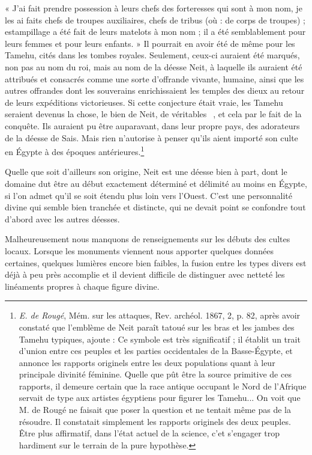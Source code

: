 \documentclass[a4paper, 11pt, oneside]{article}
\newcommand*\hieroglyhicsAADS{}
\newcommand*\hieroglyhicsAAEF{}
\newcommand*\hieroglyhicsAAEK{}
\begin{document}
« J'ai fait prendre possession à leurs chefs des forteresses qui sont à mon nom, je les ai faits chefs de troupes auxiliaires, chefs de tribus (où : de corps de troupes) ; estampillage a été fait de leurs matelots à mon nom ; il a été semblablement pour leurs femmes et pour leurs enfants. »
Il pourrait en avoir été de même pour les Tamehu, cités dans les tombes royales. Seulement, ceux-ci auraient été marqués, non pas au nom du roi, mais au nom de la déesse Neit, à laquelle ils auraient été attribués et consacrés comme une sorte d'offrande vivante, humaine, ainsi que les autres offrandes dont les souverains enrichissaient les temples des dieux au retour de leurs expéditions victorieuses. Si cette conjecture était vraie, les Tamehu seraient devenus la chose, le bien de Neit, de véritables $\hieroglyhicsAAEK\:\hieroglyhicsAADS\:\hieroglyhicsAAEF$, et cela par le fait de la conquête. Ils auraient pu être auparavant, dans leur propre pays, des adorateurs de la déesse de Sais. Mais rien n'autorise à penser qu'ils aient importé son culte en Égypte à des époques antérieures.\footnote{\emph{E. de Rougé}, Mém. sur les attaques, Rev. archéol. 1867, 2, p. 82, après avoir constaté que l'emblème de Neit paraît tatoué sur les bras et les jambes des Tamehu typiques, ajoute : Ce symbole est très significatif ; il établit un trait d'union entre ces peuples et les parties occidentales de la Basse-Égypte, et annonce les rapports originels entre les deux populations quant à leur principale divinité féminine. Quelle que pût être la source primitive de ces rapports, il demeure certain que la race antique occupant le Nord de l'Afrique servait de type aux artistes égyptiens pour figurer les Tamehu...  On voit que M. de Rougé ne faisait que poser la question et ne tentait même pas de la résoudre. Il constatait simplement les rapports originels des deux peuples. Être plus affirmatif, dans l'état actuel de la science, c'et s'engager trop hardiment sur le terrain de la pure hypothèse.}

Quelle que soit d'ailleurs son origine, Neit est une déesse bien à part, dont le domaine dut être au début exactement déterminé et délimité au moins en Égypte, si l'on admet qu'il se soit étendu plus loin vers l'Ouest. C'est une personnalité divine qui semble bien tranchée et distincte, qui ne devait point se confondre tout d'abord avec les autres déesses.

Malheureusement nous manquons de renseignements sur les débuts des cultes locaux. Lorsque les monuments viennent nous apporter quelques données certaines, quelques lumières encore bien faibles, la fusion entre les types divers est déjà à peu près accomplie et il devient difficile de distinguer avec netteté les linéaments propres à chaque figure divine.
\end{document}
